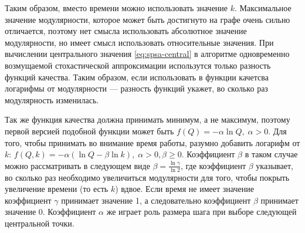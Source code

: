 Таким образом, вместо времени можно использовать значение $k$. Максимальное значение модулярности, которое может быть достигнуто на графе очень сильно отличается, поэтому нет смысла использовать абсолютное значение модулярности, но имеет смысл использовать относительные значения. При вычислении центрального значения \eqref{eq:spsa-central} в алгоритме одновременно возмущаемой стохастической аппроксимации использутся только разность функций качества. Таким образом, если использовать в функции качетсва логарифмы от модулярности --- разность функций укажет, во сколько раз модулярность изменилась.

Так же функция качества должна принимать минимум, а не максимум, поэтому первой версией подобной функции может быть $f(Q) = -\alpha \ln Q,\;\alpha > 0$. Для того, чтобы принимать во внимание время работы, разумно добавить логарифм от $k$: $f(Q, k) = -\alpha (\ln Q - \beta \ln k),\;\alpha > 0, \beta \ge 0$. Коэффициент $\beta$ в таком случае можно рассматривать в следующем виде $\beta = \frac{\ln \gamma}{\ln 2}$, где коэффициент $\beta$ указывает, во сколько раз необходимо увеличиться модулярности для того, чтобы покрыть увеличение времени (то есть $k$) вдвое. Если время не имеет значение коэффициент $\gamma$ принимает значение 1, а следовательно коэффициент $\beta$ принимает значение 0. Коэффициент $\alpha$ же играет роль размера шага при выборе следующей центральной точки.

